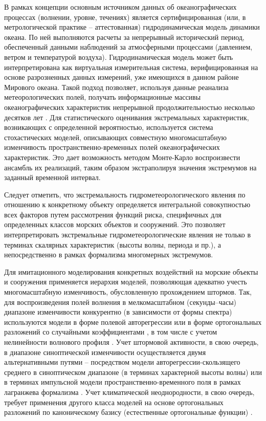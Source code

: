 В рамках концепции \citep{dk3} основным источником данных об океанографических процессах (волнении, уровне, течениях) является сертифицированная (или, в метрологической практике – аттестованная) гидродинамическая модель динамики океана. По ней выполняются расчеты за непрерывный исторический период, обеспеченный данными наблюдений за атмосферными процессами (давлением, ветром и температурой воздуха). Гидродинамическая модель может быть интерпретирована как виртуальная измерительная система, верифицированная на основе разрозненных данных измерений, уже имеющихся в данном районе Мирового океана. Такой подход позволяет, используя данные реанализа метеорологических полей, получать информационные массивы океанографических характеристик непрерывной продолжительностью несколько десятков лет \citep{dk4}. Для статистического оценивания экстремальных характеристик, возникающих с определенной вероятностью, используется система стохастических моделей, описывающих совместную многомасштабную изменчивость пространственно-временных полей океанографических характеристик. Это дает возможность методом Монте-Карло воспроизвести ансамбль их реализаций, таким образом экстраполируя значения экстремумов на заданный временной интервал.

Следует отметить, что экстремальность гидрометеорологического явления по отношению к конкретному объекту определяется интегральной совокупностью всех факторов путем рассмотрения функций риска, специфичных для определенных классов морских объектов и сооружений. Это позволяет интерпретировать экстремальные гидрометеорологические явления не только в терминах скалярных характеристик (высоты волны, периода и пр.), а непосредственно в рамках формализма многомерных экстремумов.

Для имитационного моделирования конкретных воздействий на морские объекты и сооружения применяется иерархия моделей, позволяющая адекватно учесть многомасштабную изменчивость, обусловленную прохождением штормов. Так, для воспроизведения полей волнения в мелкомасштабном (секунды--часы) диапазоне изменчивости конкурентно (в зависимости от формы спектра) используются модели в форме полевой авторегрессии \citep{dk6} или в форме ортогональных разложений со случайными коэффициентами \citep{dk7}, в том числе с учетом нелинейности волнового профиля \citep{dk8}. Учет штормовой активности, в свою очередь, в диапазоне синоптической изменчивости осуществляется двумя альтернативными путями – посредством модели авторегрессии-скользящего среднего \citep{dk9} в синоптическом диапазоне (в терминах характерной высоты волны) или в терминах импульсной модели пространственно-временного поля в рамках лагранжева формализма \citep{dk10}. Учет климатической неоднородности, в свою очередь, требует применения другого класса моделей на основе ортогональных разложений по каноническому базису (естественные ортогональные функции) \citep{dk11}.

